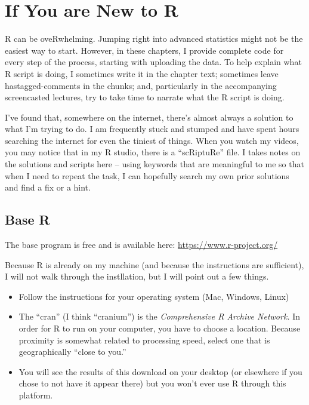 \documentclass[
  11pt,
]{book}
\providecommand{\tightlist}{%
  \setlength{\itemsep}{0pt}\setlength{\parskip}{0pt}}
\begin{document}
\hypertarget{if-you-are-new-to-r}{%
\section{If You are New to R}\label{if-you-are-new-to-r}}

R can be oveRwhelming. Jumping right into advanced statistics might not be the easiest way to start. However, in these chapters, I provide complete code for every step of the process, starting with uploading the data. To help explain what R script is doing, I sometimes write it in the chapter text; sometimes leave hastagged-comments in the chunks; and, particularly in the accompanying screencasted lectures, try to take time to narrate what the R script is doing.

I've found that, somewhere on the internet, there's almost always a solution to what I'm trying to do. I am frequently stuck and stumped and have spent hours searching the internet for even the tiniest of things. When you watch my videos, you may notice that in my R studio, there is a ``scRiptuRe'' file. I takes notes on the solutions and scripts here -- using keywords that are meaningful to me so that when I need to repeat the task, I can hopefully search my own prior solutions and find a fix or a hint.

\hypertarget{base-r}{%
\subsection{Base R}\label{base-r}}

The base program is free and is available here: \url{https://www.r-project.org/}

Because R is already on my machine (and because the instructions are sufficient), I will not walk through the instllation, but I will point out a few things.

\begin{itemize}
\tightlist
\item
  Follow the instructions for your operating system (Mac, Windows, Linux)
\item
  The ``cran'' (I think ``cranium'') is the \emph{Comprehensive R Archive Network.} In order for R to run on your computer, you have to choose a location. Because proximity is somewhat related to processing speed, select one that is geographically ``close to you.''
\item
  You will see the results of this download on your desktop (or elsewhere if you chose to not have it appear there) but you won't ever use R through this platform.
\end{itemize}
\end{document}
